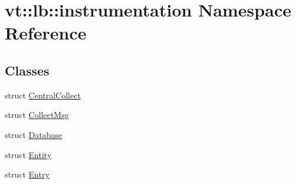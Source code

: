 \hypertarget{namespacevt_1_1lb_1_1instrumentation}{}\section{vt\+:\+:lb\+:\+:instrumentation Namespace Reference}
\label{namespacevt_1_1lb_1_1instrumentation}
\subsection*{Classes}
\begin{DoxyCompactItemize}
\item 
struct \hyperlink{structvt_1_1lb_1_1instrumentation_1_1_central_collect}{Central\+Collect}
\item 
struct \hyperlink{structvt_1_1lb_1_1instrumentation_1_1_collect_msg}{Collect\+Msg}
\item 
struct \hyperlink{structvt_1_1lb_1_1instrumentation_1_1_database}{Database}
\item 
struct \hyperlink{structvt_1_1lb_1_1instrumentation_1_1_entity}{Entity}
\item 
struct \hyperlink{structvt_1_1lb_1_1instrumentation_1_1_entry}{Entry}
\end{DoxyCompactItemize}
